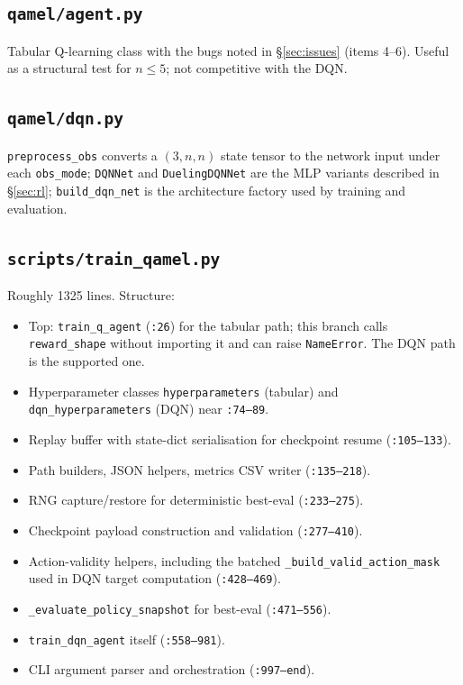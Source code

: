 \documentclass[11pt]{article}
\newcommand{\code}[1]{\texttt{#1}}
\newcommand{\file}[1]{\texttt{\small #1}}
\begin{document}
\subsection{\file{qamel/agent.py}}
Tabular Q-learning class with the bugs noted in \S\ref{sec:issues} (items 4--6). Useful as a structural test for $n \leq 5$; not competitive with the DQN.

\subsection{\file{qamel/dqn.py}}
\code{preprocess\_obs} converts a $(3,n,n)$ state tensor to the network input under each \code{obs\_mode}; \code{DQNNet} and \code{DuelingDQNNet} are the MLP variants described in \S\ref{sec:rl}; \code{build\_dqn\_net} is the architecture factory used by training and evaluation.

\subsection{\file{scripts/train\_qamel.py}}
Roughly 1325 lines. Structure:
\begin{itemize}
  \item Top: \code{train\_q\_agent} (\file{:26}) for the tabular path; this branch calls \code{reward\_shape} without importing it and can raise \code{NameError}. The DQN path is the supported one.
  \item Hyperparameter classes \code{hyperparameters} (tabular) and \code{dqn\_hyperparameters} (DQN) near \file{:74--89}.
  \item Replay buffer with state-dict serialisation for checkpoint resume (\file{:105--133}).
  \item Path builders, JSON helpers, metrics CSV writer (\file{:135--218}).
  \item RNG capture/restore for deterministic best-eval (\file{:233--275}).
  \item Checkpoint payload construction and validation (\file{:277--410}).
  \item Action-validity helpers, including the batched \code{\_build\_valid\_action\_mask} used in DQN target computation (\file{:428--469}).
  \item \code{\_evaluate\_policy\_snapshot} for best-eval (\file{:471--556}).
  \item \code{train\_dqn\_agent} itself (\file{:558--981}).
  \item CLI argument parser and orchestration (\file{:997--end}).
\end{itemize}
\end{document}
